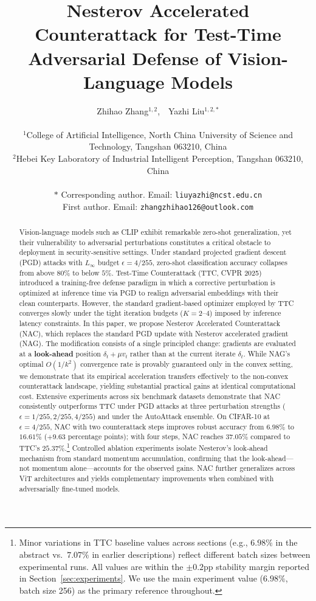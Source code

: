 \documentclass[12pt,a4paper]{article}
\title{Nesterov Accelerated Counterattack for Test-Time Adversarial Defense of Vision-Language Models}
\author{%
  Zhihao Zhang$^{1,2}$,~~Yazhi Liu$^{1,2,\ast}$\\
  \\
  $^{1}$College of Artificial Intelligence, North China University of Science and Technology, Tangshan 063210, China\\
  $^{2}$Hebei Key Laboratory of Industrial Intelligent Perception, Tangshan 063210, China\\
  \\
  $\ast$ Corresponding author. Email: \texttt{liuyazhi@ncst.edu.cn}\\[4pt]
  First author. Email: \texttt{zhangzhihao126@outlook.com}
}
\date{}
\begin{document}
\maketitle

\begin{abstract}
Vision-language models such as CLIP exhibit remarkable zero-shot generalization, yet their vulnerability to adversarial perturbations constitutes a critical obstacle to deployment in security-sensitive settings. Under standard projected gradient descent (PGD) attacks with $L_\infty$ budget $\epsilon=4/255$, zero-shot classification accuracy collapses from above $80\%$ to below $5\%$. Test-Time Counterattack (TTC, CVPR 2025) introduced a training-free defense paradigm in which a corrective perturbation is optimized at inference time via PGD to realign adversarial embeddings with their clean counterparts. However, the standard gradient-based optimizer employed by TTC converges slowly under the tight iteration budgets ($K=2$--$4$) imposed by inference latency constraints. In this paper, we propose Nesterov Accelerated Counterattack (NAC), which replaces the standard PGD update with Nesterov accelerated gradient (NAG). The modification consists of a single principled change: gradients are evaluated at a \textbf{look-ahead} position $\delta_t + \mu v_t$ rather than at the current iterate $\delta_t$. While NAG's optimal $O(1/k^2)$ convergence rate is provably guaranteed only in the convex setting, we demonstrate that its empirical acceleration transfers effectively to the non-convex counterattack landscape, yielding substantial practical gains at identical computational cost. Extensive experiments across six benchmark datasets demonstrate that NAC consistently outperforms TTC under PGD attacks at three perturbation strengths ($\epsilon=1/255, 2/255, 4/255$) and under the AutoAttack ensemble. On CIFAR-10 at $\epsilon=4/255$, NAC with two counterattack steps improves robust accuracy from $6.98\%$ to $16.61\%$ ($+9.63$ percentage points); with four steps, NAC reaches $37.05\%$ compared to TTC's $25.37\%$.\footnote{Minor variations in TTC baseline values across sections (e.g., $6.98\%$ in the abstract vs.\ $7.07\%$ in earlier descriptions) reflect different batch sizes between experimental runs. All values are within the $\pm 0.2$pp stability margin reported in Section~\ref{sec:experiments}. We use the main experiment value ($6.98\%$, batch size 256) as the primary reference throughout.} Controlled ablation experiments isolate Nesterov's look-ahead mechanism from standard momentum accumulation, confirming that the look-ahead---not momentum alone---accounts for the observed gains. NAC further generalizes across ViT architectures and yields complementary improvements when combined with adversarially fine-tuned models.
\end{abstract}
\end{document}
